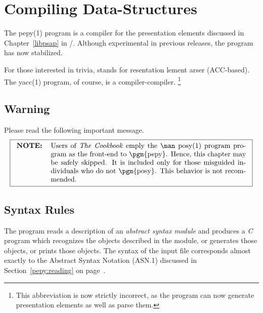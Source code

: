 
\chapter	{Compiling Data-Structures}\label{pepy}
The \man pepy(1) program is a compiler for the presentation
elements discussed in Chapter~\ref{libpsap} in \volone/.
Although experimental in previous releases,
the  program has now stabilized.

For those interested in trivia,
 stands for
resentation
lement
arser
(ACC-based).
The \man yacc(1) program,
of course,
is a compiler-compiler.%
\footnote{This abbreviation is now strictly incorrect, as the 
program can now generate presentation elements as well as parse them.}

\section	{Warning}
Please read the following important message.
\[\fbox{\begin{tabular}{lp{0.8\textwidth}}
\bf NOTE:&	Users of {\em The Cookbook\/} emply the \man posy(1) program
		program as the front-end to \pgm{pepy}.
		Hence, this chapter may be safely skipped.
		It is included only for those misguided individuals who do not
		\pgm{posy}.
		This behavior is not recommended.
\end{tabular}}\]

\section	{Syntax Rules}
The  program reads a description of an {\em abstract syntax
module\/}
and produces a {\em C\/} program
which recognizes the objects described in the module,
or generates those objects,
or prints those objects.
The syntax of the input file corresponds almost exactly to the Abstract
Syntax Notation (ASN.1) discussed in Section~\ref{pepy:reading} on
page~\pageref{pepy:reading}.

